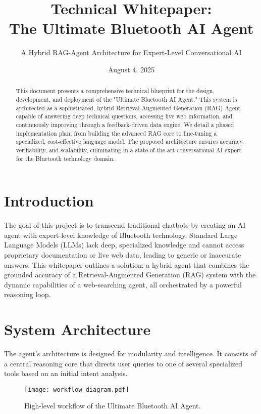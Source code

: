 \documentclass[11pt, a4paper]{article}
\title{\textbf{Technical Whitepaper: \\ The Ultimate Bluetooth AI Agent}}
\author{A Hybrid RAG-Agent Architecture for Expert-Level Conversational AI}
\date{August 4, 2025}
\begin{document}
\maketitle

\begin{abstract}
\noindent This document presents a comprehensive technical blueprint for the design, development, and deployment of the "Ultimate Bluetooth AI Agent." This system is architected as a sophisticated, hybrid Retrieval-Augmented Generation (RAG) Agent capable of answering deep technical questions, accessing live web information, and continuously improving through a feedback-driven data engine. We detail a phased implementation plan, from building the advanced RAG core to fine-tuning a specialized, cost-effective language model. The proposed architecture ensures accuracy, verifiability, and scalability, culminating in a state-of-the-art conversational AI expert for the Bluetooth technology domain.
\end{abstract}

\tableofcontents
\newpage

\section{Introduction}
The goal of this project is to transcend traditional chatbots by creating an AI agent with expert-level knowledge of Bluetooth technology. Standard Large Language Models (LLMs) lack deep, specialized knowledge and cannot access proprietary documentation or live web data, leading to generic or inaccurate answers. This whitepaper outlines a solution: a hybrid agent that combines the grounded accuracy of a Retrieval-Augmented Generation (RAG) system with the dynamic capabilities of a web-searching agent, all orchestrated by a powerful reasoning loop.

\section{System Architecture}
The agent's architecture is designed for modularity and intelligence. It consists of a central reasoning core that directs user queries to one of several specialized tools based on an initial intent analysis.

\begin{figure}[h!]
    \centering
    \texttt{[image: workflow\_diagram.pdf]}
    \caption{High-level workflow of the Ultimate Bluetooth AI Agent.}
    \label{fig:workflow}
\end{figure}
\end{document}
